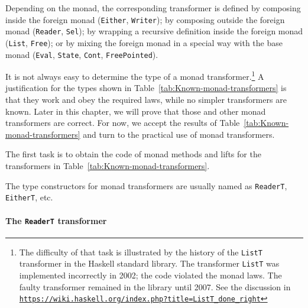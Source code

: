 Depending on the monad, the corresponding transformer is defined by
composing inside the foreign monad (\lstinline!Either!, \lstinline!Writer!);
by composing outside the foreign monad (\lstinline!Reader!, \lstinline!Sel!);
by wrapping a recursive definition inside the foreign monad (\lstinline!List!,
\lstinline!Free!); or by mixing the foreign monad in a special way
with the base monad (\lstinline!Eval!, \lstinline!State!, \lstinline!Cont!,
\lstinline!FreePointed!). 

It is not always easy to determine the type of a monad transformer.\footnote{The difficulty of that task is illustrated by the history of the \lstinline!ListT!
transformer in the Haskell standard library. The transformer \lstinline!ListT!
was implemented incorrectly in 2002; the code violated the monad laws.
The faulty transformer remained in the library until 2007. See the
discussion in \texttt{\href{https://wiki.haskell.org/index.php?title=ListT_done_right}{https://wiki.haskell.org/index.php?title=ListT\_done\_right}}} A justification for the types shown in Table~\ref{tab:Known-monad-transformers}
is that they work and obey the required laws, while no simpler transformers
are known. Later in this chapter, we will prove that those and other
monad transformers are correct. For now, we accept the results of
Table~\ref{tab:Known-monad-transformers} and turn to the practical
use of monad transformers. 

The first task is to obtain the code of monad methods and lifts for
the transformers in Table~\ref{tab:Known-monad-transformers}.

The type constructors for monad transformers are usually named as
\lstinline!ReaderT!, \lstinline!EitherT!, etc.

\paragraph{The \texttt{ReaderT} transformer}

